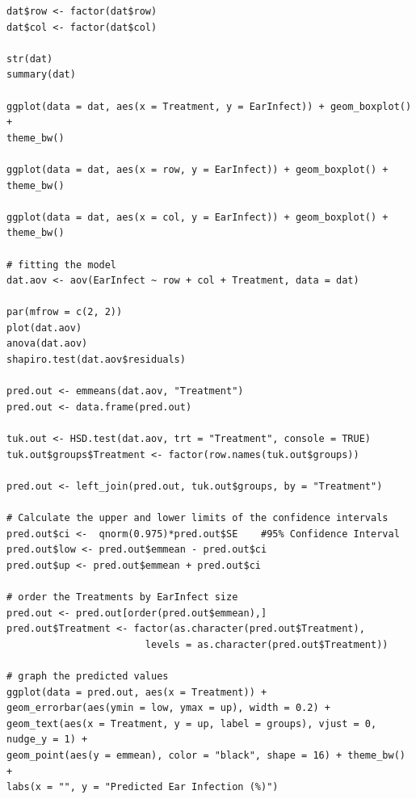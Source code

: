 \documentclass[a4paper, 10pt, fleqn, twosided]{memoir}
\begin{document}
\begin{tcolorbox}[title = Exercise 5 code]
\begin{verbatim}
dat$row <- factor(dat$row)
dat$col <- factor(dat$col)

str(dat)
summary(dat)

ggplot(data = dat, aes(x = Treatment, y = EarInfect)) + geom_boxplot() +
theme_bw()

ggplot(data = dat, aes(x = row, y = EarInfect)) + geom_boxplot() +
theme_bw()

ggplot(data = dat, aes(x = col, y = EarInfect)) + geom_boxplot() +
theme_bw()

# fitting the model
dat.aov <- aov(EarInfect ~ row + col + Treatment, data = dat)

par(mfrow = c(2, 2))
plot(dat.aov)
anova(dat.aov)
shapiro.test(dat.aov$residuals)

pred.out <- emmeans(dat.aov, "Treatment")
pred.out <- data.frame(pred.out)

tuk.out <- HSD.test(dat.aov, trt = "Treatment", console = TRUE)
tuk.out$groups$Treatment <- factor(row.names(tuk.out$groups))

pred.out <- left_join(pred.out, tuk.out$groups, by = "Treatment")

# Calculate the upper and lower limits of the confidence intervals
pred.out$ci <-  qnorm(0.975)*pred.out$SE    #95% Confidence Interval
pred.out$low <- pred.out$emmean - pred.out$ci
pred.out$up <- pred.out$emmean + pred.out$ci

# order the Treatments by EarInfect size
pred.out <- pred.out[order(pred.out$emmean),]
pred.out$Treatment <- factor(as.character(pred.out$Treatment),
                        levels = as.character(pred.out$Treatment))
 
# graph the predicted values 
ggplot(data = pred.out, aes(x = Treatment)) +
geom_errorbar(aes(ymin = low, ymax = up), width = 0.2) +
geom_text(aes(x = Treatment, y = up, label = groups), vjust = 0, nudge_y = 1) +
geom_point(aes(y = emmean), color = "black", shape = 16) + theme_bw() +
labs(x = "", y = "Predicted Ear Infection (%)")
\end{verbatim}
\end{tcolorbox}
\end{document}
